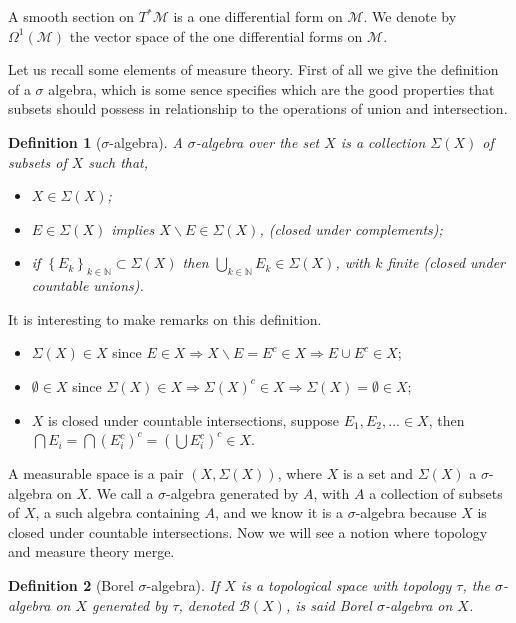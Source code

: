 \documentclass[10pt]{book}
\newcommand{\Mcal}{\mathcal{M}}
\theoremstyle{break}
\newtheorem{definition}{Definition}
\begin{document}
\bigskip

A smooth section on $T^\ast\Mcal$ is a one differential form on $\Mcal$. We denote by $\Omega^1(\Mcal)$ the vector space of the one differential forms on $\Mcal$.


\bigskip


Let us recall some elements of measure theory. First of all we give the definition of a $\sigma$ algebra, which is some sence specifies which are the good properties that subsets should possess in relationship to the operations of union and intersection. 


\begin{definition}[$\sigma$-algebra]
A $\sigma$-algebra over the set $X$ is a collection $\Sigma(X)$ of subsets of $X$ such that,
\begin{itemize}
\item $X \in \Sigma(X)$; 
\item $E \in \Sigma(X)$ implies $X \backslash E \in \Sigma(X)$, \; (closed under complements);
\item if $\left\{ E_k \right\} _{k \in \mathbb{N}} \subset \Sigma(X)$ then $\underset{k \in \mathbb{N}}{\bigcup} E_k \in \Sigma(X)$, with $k$ finite \; (closed under countable unions).
\end{itemize}
\end{definition}


It is interesting to make remarks on this definition. 
\begin{itemize}
\item $\Sigma(X) \in X$ since $E \in X \Rightarrow X \backslash E = E^c \in X \Rightarrow E \cup E^c \in X$;
\item $\emptyset \in X$ since $\Sigma(X) \in X \Rightarrow \Sigma(X)^c \in X \Rightarrow \Sigma(X) = \emptyset \in X$;
\item $X$ is closed under countable intersections, suppose $E_1, E_2, ... \in X$, then $\bigcap E_i = \bigcap (E_i^c)^c = ( \bigcup E_i^c )^c \in X$.
\end{itemize}


A measurable space is a pair $(X, \Sigma(X))$, where $X$ is a set and $\Sigma(X)$ a $\sigma$-algebra on $X$. We call a $\sigma$-algebra generated by $A$, with $A$ a collection of subsets of $X$, a such algebra containing $A$, and we know it is a $\sigma$-algebra because $X$ is closed under countable intersections. Now we will see a notion where topology and measure theory merge.


\begin{definition}[Borel $\sigma$-algebra]
If $X$ is a topological space with topology $\tau$, the $\sigma$-algebra on $X$ generated by $\tau$, denoted $\mathcal{B}(X)$, is said Borel $\sigma$-algebra on $X$.
\end{definition}
\end{document}
